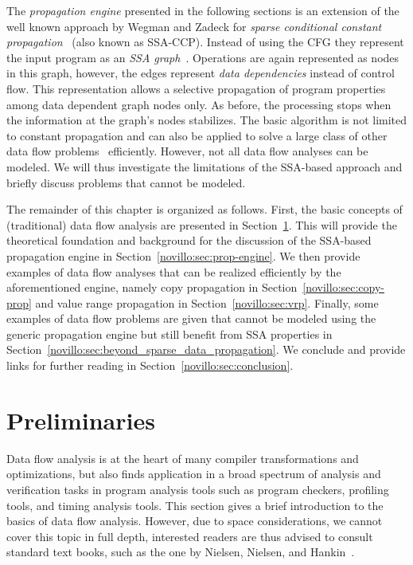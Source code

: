 The \emph{propagation engine} presented in the following sections is an
extension of the well known approach by Wegman and Zadeck for \emph{sparse
conditional constant propagation}~\cite{bib:wegman.ea-91} (also known as
SSA-CCP). Instead of using the CFG they represent the input program as an
\emph{SSA graph}~\cite{novillo:bib:CFRWZ91}. Operations are again represented as
nodes in this graph, however, the edges represent \emph{data dependencies}
instead of control flow. This representation allows a selective propagation of
program properties among data dependent graph nodes only. As before, the
processing stops when the information at the graph's nodes stabilizes. The basic
algorithm is not limited to constant propagation and can also be applied to
solve a large class of other data flow problems~\cite{novillo:bib:N05}
efficiently. However, not all data flow analyses can be modeled. We will thus
investigate the limitations of the SSA-based approach and briefly discuss
problems that cannot be modeled.

The remainder of this chapter is organized as follows. First, the basic concepts
of (traditional) data flow analysis are presented in
Section~\ref{novillo:sec:preliminaries}. This will provide the theoretical
foundation and background for the discussion of the SSA-based propagation
engine in Section~\ref{novillo:sec:prop-engine}. We then provide examples of
data flow analyses that can be realized efficiently by the aforementioned
engine, namely copy propagation in Section~\ref{novillo:sec:copy-prop} and value
range propagation in Section~\ref{novillo:sec:vrp}. Finally, some examples of
data flow problems are given that cannot be modeled using the generic
propagation engine but still benefit from SSA properties in
Section~\ref{novillo:sec:beyond_sparse_data_propagation}. We conclude and
provide links for further reading in Section~\ref{novillo:sec:conclusion}.

\section{Preliminaries}
\label{novillo:sec:preliminaries}

Data flow analysis is at the heart of many compiler transformations and
optimizations, but also finds application in a broad spectrum of analysis and
verification tasks in program analysis tools such as program checkers, profiling
tools, and timing analysis tools. This section gives a brief introduction to the
basics of data flow analysis. However, due to space considerations, we cannot
cover this topic in full depth, interested readers are thus advised to consult
standard text books, such as the one by Nielsen, Nielsen, and
Hankin~\cite{novillo:bib:NNH99}.

